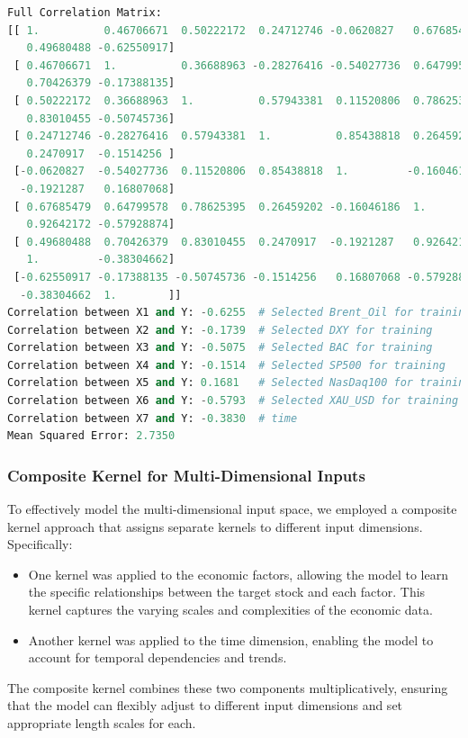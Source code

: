 \begin{lstlisting}[language=Python]
Full Correlation Matrix:
[[ 1.          0.46706671  0.50222172  0.24712746 -0.0620827   0.67685479
   0.49680488 -0.62550917]
 [ 0.46706671  1.          0.36688963 -0.28276416 -0.54027736  0.64799578
   0.70426379 -0.17388135]
 [ 0.50222172  0.36688963  1.          0.57943381  0.11520806  0.78625395
   0.83010455 -0.50745736]
 [ 0.24712746 -0.28276416  0.57943381  1.          0.85438818  0.26459202
   0.2470917  -0.1514256 ]
 [-0.0620827  -0.54027736  0.11520806  0.85438818  1.         -0.16046186
  -0.1921287   0.16807068]
 [ 0.67685479  0.64799578  0.78625395  0.26459202 -0.16046186  1.
   0.92642172 -0.57928874]
 [ 0.49680488  0.70426379  0.83010455  0.2470917  -0.1921287   0.92642172
   1.         -0.38304662]
 [-0.62550917 -0.17388135 -0.50745736 -0.1514256   0.16807068 -0.57928874
  -0.38304662  1.        ]]
Correlation between X1 and Y: -0.6255  # Selected Brent_Oil for training
Correlation between X2 and Y: -0.1739  # Selected DXY for training
Correlation between X3 and Y: -0.5075  # Selected BAC for training
Correlation between X4 and Y: -0.1514  # Selected SP500 for training
Correlation between X5 and Y: 0.1681   # Selected NasDaq100 for training
Correlation between X6 and Y: -0.5793  # Selected XAU_USD for training
Correlation between X7 and Y: -0.3830  # time
Mean Squared Error: 2.7350
\end{lstlisting}

\subsubsection{Composite Kernel for Multi-Dimensional Inputs}

To effectively model the multi-dimensional input space, we employed a composite kernel approach that assigns separate kernels to different input dimensions. Specifically:

\begin{itemize}
    \item One kernel was applied to the economic factors, allowing the model to learn the specific relationships between the target stock and each factor. This kernel captures the varying scales and complexities of the economic data.
    \item Another kernel was applied to the time dimension, enabling the model to account for temporal dependencies and trends. 
\end{itemize}

The composite kernel combines these two components multiplicatively, ensuring that the model can flexibly adjust to different input dimensions and set appropriate length scales for each. 

